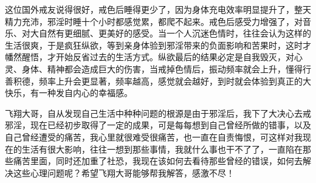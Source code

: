 \begin{case}
    这位国外戒友说得很好，戒色后睡得更少了，因为身体充电效率明显提升了，整天精力充沛，邪淫时睡十个小时都感觉累，都爬不起来。戒色后感受力增强了，对音乐、对大自然有更细腻、更美好的感受。当一个人沉迷色情时，往往会认为这样的生活很爽，于是疯狂纵欲，等到亲身体验到邪淫带来的负面影响和苦果时，这时才幡然醒悟，才开始反省过去的生活方式。纵欲最后的结果必定是自我毁灭，对心灵、身体、精神都会造成巨大的伤害，当戒掉色情后，振动频率就会上升，懂得行善积德，频率上升会更显著，频率越高，感觉就会越好，到时就会体验到真正的大快乐，有一种发自内心的幸福感。
\end{case}

\begin{case}
    飞翔大哥，自从发现自己生活中种种问题的根源是由于邪淫后，我下了大决心去戒邪淫，现在已经初步取得了一定的成果，可是每每想到自己曾经所做的错事，以及自己曾经遭受的痛苦，我心里就很难受很痛苦，也一直在自责悔恨，可这样对我现在的生活有很大影响，往往一想到那些事情，我就什么事也干不了了，一直陷在那些痛苦里面，同时还加重了社恐，我现在该如何去看待那些曾经的错误，如何去解决这些心理问题呢？希望飞翔大哥能够帮我解答，感激不尽！

\end{case}
